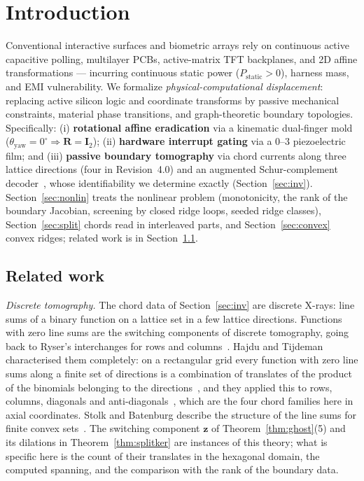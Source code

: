 \documentclass[11pt,a4paper]{article}
\theoremstyle{definition}
\theoremstyle{remark}
\begin{document}
\section{Introduction}

Conventional interactive surfaces and biometric arrays rely on continuous active capacitive polling, multilayer PCBs, active-matrix TFT backplanes, and 2D affine transformations --- incurring continuous static power ($P_{\text{static}} > 0$), harness mass, and EMI vulnerability. We formalize \textit{physical-computational displacement}: replacing active silicon logic and coordinate transforms by passive mechanical constraints, material phase transitions, and graph-theoretic boundary topologies. Specifically: (i) \textbf{rotational affine eradication} via a kinematic dual-finger mold ($\theta_{\text{yaw}} = 0^\circ \Rightarrow \mathbf{R} = \mathbf{I}_2$); (ii) \textbf{hardware interrupt gating} via a $0$--$3$ piezoelectric film; and (iii) \textbf{passive boundary tomography} via chord currents along three lattice directions (four in Revision~4.0) and an augmented Schur-complement decoder~\cite{calderon1980,schur1917}, whose identifiability we determine exactly (Section~\ref{sec:inv}). Section~\ref{sec:nonlin} treats the nonlinear problem (monotonicity, the rank of the boundary Jacobian, screening by closed ridge loops, seeded ridge classes), Section~\ref{sec:split} chords read in interleaved parts, and Section~\ref{sec:convex} convex ridges; related work is in Section~\ref{sec:related}.

\subsection{Related work}\label{sec:related}
\emph{Discrete tomography.} The chord data of Section~\ref{sec:inv} are discrete X-rays: line sums of a binary function on a lattice set in a few lattice directions. Functions with zero line sums are the switching components of discrete tomography, going back to Ryser's interchanges for rows and columns~\cite{ryser1957}. Hajdu and Tijdeman characterised them completely: on a rectangular grid every function with zero line sums along a finite set of directions is a combination of translates of the product of the binomials belonging to the directions~\cite{hajdu2001}, and they applied this to rows, columns, diagonals and anti-diagonals~\cite{hajdu2001laa}, which are the four chord families here in axial coordinates. Stolk and Batenburg describe the structure of the line sums for finite convex sets~\cite{stolk2010}. The switching component $\mathbf{z}$ of Theorem~\ref{thm:ghost}(5) and its dilations in Theorem~\ref{thm:splitker} are instances of this theory; what is specific here is the count of their translates in the hexagonal domain, the computed spanning, and the comparison with the rank of the boundary data.
\end{document}
